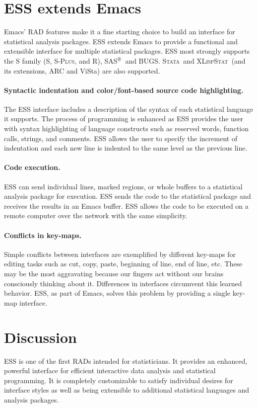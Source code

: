 \documentclass{article}
\newcommand{\SAS}{\textsc{SAS}$^{\mbox{\scriptsize\textregistered}}$}
\newcommand{\Splus}{\textsc{S-Plus}}
\newcommand*{\XLispStat}{\textsc{XLispStat}}
\newcommand*{\Stata}{\textsc{Stata}}
\begin{document}
\section{ESS extends Emacs}
\label{sec:ess-extends-emacs}

Emacs' RAD features make it a fine starting choice to
build an interface for statistical analysis packages.  ESS extends
Emacs to provide a functional and extensible interface
for multiple statistical packages. 
ESS most strongly supports the S family (S, \Splus, and R), \SAS\ and BUGS.  
\Stata\ and \XLispStat\ (and its extensions, ARC and ViSta) are
also supported.

\paragraph{Syntactic indentation and color/font-based source code
  highlighting.}  The ESS interface includes a description of the
syntax of each statistical language it supports.
The process of programming is enhanced as ESS provides the user with
syntax highlighting of language constructs such as reserved words,
function calls, strings, and comments.  ESS allows the user to specify
the increment of indentation and each new line is indented
to the same level as the previous line.

\paragraph{Code execution.}
ESS can send individual lines, marked regions, or whole buffers to a 
statistical analysis package for execution.  ESS sends the code to
the statistical package and receives the results in an Emacs buffer.  
ESS allows the code to be executed on a remote computer over the network 
with the same simplicity.  

\paragraph{Conflicts in key-maps.}
Simple conflicts between interfaces are exemplified by different
key-maps for editing tasks such as cut, copy, paste, beginning of
line, end of line, etc.  These may be the most aggravating
because our fingers act without our brains consciously
thinking about it.  Differences in interfaces
circumvent this learned behavior.  ESS, as part of Emacs, 
solves this problem by providing a single key-map interface.

\section{Discussion}
\label{sec:discussion}

ESS is one of the first RADs intended for statisticians.  It provides
an enhanced, powerful interface for efficient interactive data
analysis and statistical programming.  It is completely customizable
to satisfy individual desires for interface styles as well as being
extensible to additional statistical languages and analysis packages.
\end{document}
